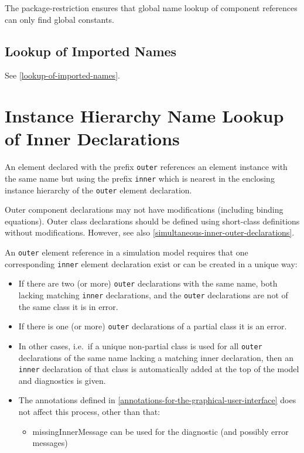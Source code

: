 \begin{nonnormative}
The package-restriction ensures that global name lookup of
component references can only find global constants.
\end{nonnormative}

\subsection{Lookup of Imported Names}\label{lookup-of-imported-names1}

See \cref{lookup-of-imported-names}.

\section{Instance Hierarchy Name Lookup of Inner Declarations}\label{instance-hierarchy-name-lookup-of-inner-declarations}

An element declared with the prefix \lstinline!outer! references an element instance
with the same name but using the prefix \lstinline!inner! which is nearest in the
enclosing instance hierarchy of the \lstinline!outer! element declaration.

Outer component declarations may not have modifications (including binding equations).
Outer class declarations should be defined using short-class
definitions without modifications. However, see also \cref{simultaneous-inner-outer-declarations}.

An \lstinline!outer! element reference in a simulation model requires that one
corresponding \lstinline!inner! element declaration exist or can be created in a
unique way:
\begin{itemize}
\item
  If there are two (or more) \lstinline!outer! declarations with the same name, both
  lacking matching \lstinline!inner! declarations, and the \lstinline!outer! declarations are
  not of the same class it is in error.
\item
  If there is one (or more) \lstinline!outer! declarations of a partial class it is
  an error.
\item
  In other cases, i.e.\ if a unique non-partial class is used for all
  \lstinline!outer! declarations of the same name lacking a matching inner
  declaration, then an \lstinline!inner! declaration of that class is automatically
  added at the top of the model and diagnostics is given.
\item
  The annotations defined in \cref{annotations-for-the-graphical-user-interface} does not affect this process,
  other than that:

  \begin{itemize}
  \item
    missingInnerMessage can be used for the diagnostic (and possibly
    error messages)
  \end{itemize}
\end{itemize}

